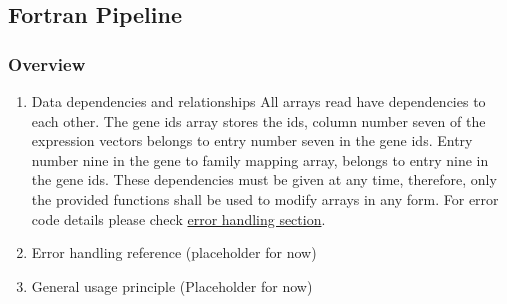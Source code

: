 \documentclass[11pt]{article}
\begin{document}
\subsection{Fortran Pipeline}
\subsubsection{Overview}
\begin{enumerate}
	\item Data dependencies and relationships All arrays read have dependencies to
	      each other. The gene ids array stores the ids, column number seven of the expression
	      vectors belongs to entry number seven in the gene ids. Entry number nine
	      in the gene to family mapping array, belongs to entry nine in the gene ids.
	      These dependencies must be given at any time, therefore, only the provided
	      functions shall be used to modify arrays in any form. For error code details
	      please check \hyperref[sec:error-handling]{error handling section}.
	      
	\item Error handling reference (placeholder for now)
	      
	\item General usage principle (Placeholder for now)
\end{enumerate}
\end{document}
